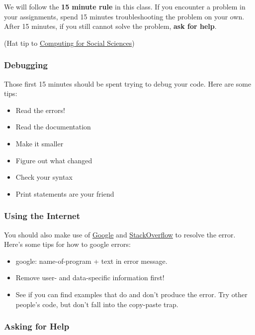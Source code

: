 \documentclass[]{book}
\providecommand{\tightlist}{%
  \setlength{\itemsep}{0pt}\setlength{\parskip}{0pt}}
\begin{document}
We will follow the \textbf{15 minute rule} in this class. If you
encounter a problem in your assignments, spend 15 minutes
troubleshooting the problem on your own. After 15 minutes, if you still
cannot solve the problem, \textbf{ask for help}.

(Hat tip to
\href{https://cfss.uchicago.edu/faq/asking-questions/}{Computing for
Social Sciences})

\subsubsection*{Debugging}\label{debugging}

Those first 15 minutes should be spent trying to debug your code. Here
are some tips:

\begin{itemize}
\tightlist
\item
  Read the errors!
\item
  Read the documentation
\item
  Make it smaller
\item
  Figure out what changed
\item
  Check your syntax
\item
  Print statements are your friend
\end{itemize}

\subsubsection*{Using the Internet}\label{using-the-internet}

You should also make use of \href{https://www.google.com}{Google} and
\href{http://stackoverflow.com/}{StackOverflow} to resolve the error.
Here's some tips for how to google errors:

\begin{itemize}
\tightlist
\item
  google: name-of-program + text in error message.
\item
  Remove user- and data-specific information first!
\item
  See if you can find examples that do and don't produce the error. Try
  other people's code, but don't fall into the copy-paste trap.
\end{itemize}

\subsubsection*{Asking for Help}\label{asking-for-help}
\end{document}
